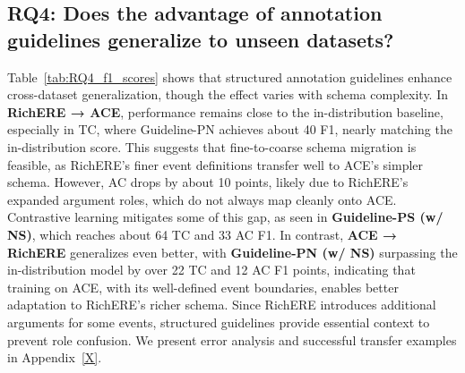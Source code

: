 \subsection{RQ4: Does the advantage of annotation guidelines generalize to unseen datasets?}
Table~\ref{tab:RQ4_f1_scores} shows that structured annotation guidelines enhance cross-dataset generalization, though the effect varies with schema complexity. In \textbf{RichERE → ACE}, performance remains close to the in-distribution baseline, especially in TC, where Guideline-PN achieves about 40 F1, nearly matching the in-distribution score. This suggests that fine-to-coarse schema migration is feasible, as RichERE’s finer event definitions transfer well to ACE’s simpler schema. However, AC drops by about 10 points, likely due to RichERE’s expanded argument roles, which do not always map cleanly onto ACE. Contrastive learning mitigates some of this gap, as seen in \textbf{Guideline-PS (w/ NS)}, which reaches about 64 TC and 33 AC F1. In contrast, \textbf{ACE → RichERE} generalizes even better, with \textbf{Guideline-PN (w/ NS)} surpassing the in-distribution model by over 22 TC and 12 AC F1 points, indicating that training on ACE, with its well-defined event boundaries, enables better adaptation to RichERE’s richer schema. Since RichERE introduces additional arguments for some events, structured guidelines provide essential context to prevent role confusion. We present error analysis and successful transfer examples in Appendix~\ref{X}.

